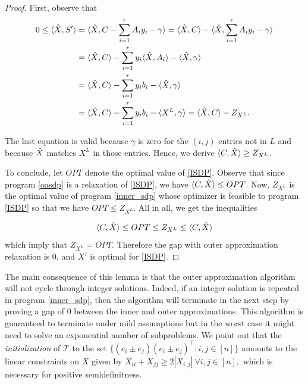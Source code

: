 \documentclass{article}
\begin{document}
\begin{proof}

First, observe that
\begin{equation}
 \begin{aligned}
     0 \leq \langle \Hat{X}, S' \rangle & = \langle \Hat{X}, C-\sum_{i=1}^r A_iy_i-\gamma \rangle 
    =   \langle \Hat{X}, C \rangle - \langle \Hat{X}, \sum_{i=1}^r A_iy_i-\gamma \rangle \\
   &  =  \langle \Hat{X}, C \rangle -  \sum_{i=1}^r y_i \langle \Hat{X},A_i \rangle - \langle \Hat{X},\gamma \rangle\\
   & =  \langle \Hat{X}, C \rangle -  \sum_{i=1}^r y_ib_i - \langle \Hat{X},\gamma \rangle \\
   & = \langle \Hat{X}, C \rangle -  \sum_{i=1}^r y_ib_i - \langle X^L,\gamma \rangle =  \langle \Hat{X}, C \rangle - Z_{X^L}.
  \end{aligned}
\end{equation}

The last equation is valid because $\gamma$ is zero for the $(i,j)$ entries not in $L$ and because $\Hat{X}$ matches $X^L$ in those entries. Hence, we derive 
$\langle C,\Hat{X} \rangle \geq Z_{X^L}$.

To conclude, let $OPT$ denote the optimal value of \eqref{ISDP}. Observe that since program \eqref{oasdp} is a relaxation of \eqref{ISDP}, we have $ \langle C,\Hat{X} \rangle \leq OPT $. Now, $Z_{X^L}$ is the optimal value of program \eqref{inner_sdp}  whose optimizer is feasible to program \eqref{ISDP} so that we have $OPT \leq Z_{X^L} $. All in all, we get the inequalities

\[\langle C,\Hat{X} \rangle \leq OPT  \leq Z_{X^L} \leq \langle C,\Hat{X} \rangle\]
which imply that $Z_{X^L} = OPT$. Therefore the gap with outer approximation relaxation is $0$, and $X'$ is optimal for \eqref{ISDP}.
\end{proof}

The main consequence of this lemma is that the outer approximation algorithm will not cycle through integer solutions. Indeed, if an integer solution is repeated in program \eqref{inner_sdp}, then the algorithm will terminate in the next step by proving a gap of $0$ between the inner and outer approximations. This algorithm is guaranteed to terminate under mild assumptions but in the worst case it might need to solve an exponential number of subproblems. We point out that the \textit{initialization} of $\mathcal{T}$ to the set 
$ \{(e_i\pm e_j)(e_i\pm e_j)^\top: i,j \in [n]\}$ amounts to the linear constraints on $X$ given by
$
X_{ii} + X_{jj} \geq 2|X_{i,j}| \ \forall i,j \in [n],
$
which is necessary for positive semidefinitness.
\end{document}
